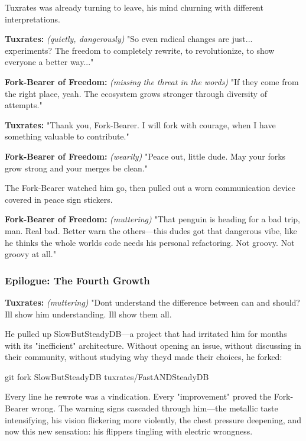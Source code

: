 Tuxrates was already turning to leave, his mind churning with different interpretations.

\textbf{Tuxrates:} \emph{(quietly, dangerously)} "So even radical changes are just... experiments? The freedom to completely rewrite, to revolutionize, to show everyone a better way..."

\textbf{Fork-Bearer of Freedom:} \emph{(missing the threat in the words)} "If they come from the right place, yeah. The ecosystem grows stronger through diversity of attempts."

\textbf{Tuxrates:} "Thank you, Fork-Bearer. I will fork with courage, when I have something valuable to contribute."

\textbf{Fork-Bearer of Freedom:} \emph{(wearily)} "Peace out, little dude. May your forks grow strong and your merges be clean."

The Fork-Bearer watched him go, then pulled out a worn communication device covered in peace sign stickers.

\textbf{Fork-Bearer of Freedom:} \emph{(muttering)} "That penguin is heading for a bad trip, man. Real bad. Better warn the others---this dude\textquotesingle s got that dangerous vibe, like he thinks the whole world\textquotesingle s code needs his personal refactoring. Not groovy. Not groovy at all."

\bookdivider

\subsubsection{Epilogue: The Fourth Growth}\label{epilogue-the-fourth-growth}

\textbf{Tuxrates:} \emph{(muttering)} "Don\textquotesingle t understand the difference between \textquotesingle can\textquotesingle{} and \textquotesingle should\textquotesingle? I\textquotesingle ll show him understanding. I\textquotesingle ll show them all.

He pulled up SlowButSteadyDB---a project that had irritated him for months with its "inefficient" architecture. Without opening an issue, without discussing in their community, without studying why they\textquotesingle d made their choices, he forked:

\begin{codeblock}
git fork SlowButSteadyDB tuxrates/FastANDSteadyDB
\end{codeblock}

Every line he rewrote was a vindication. Every "improvement" proved the Fork-Bearer wrong. The warning signs cascaded through him---the metallic taste intensifying, his vision flickering more violently, the chest pressure deepening, and now this new sensation: his flippers tingling with electric wrongness.

